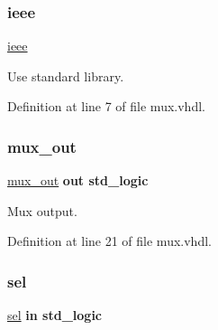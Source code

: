\subsubsection{\texorpdfstring{ieee}{ieee}}
{\footnotesize\ttfamily \hyperlink{classmux__using__with_a0a6af6eef40212dbaf130d57ce711256}{ieee}\hspace{0.3cm}{\ttfamily [Library]}}



Use standard library. 



Definition at line 7 of file mux.\+vhdl.

\mbox{\label{classmux__using__with_a4702d5a6e2987c3dfd152f7615550900}} 
\subsubsection{\texorpdfstring{mux\+\_\+out}{mux\_out}}
{\footnotesize\ttfamily \hyperlink{classmux__using__with_a4702d5a6e2987c3dfd152f7615550900}{mux\+\_\+out} {\bfseries \textcolor{keywordflow}{out}\textcolor{vhdlchar}{ }} {\bfseries \textcolor{comment}{std\+\_\+logic}\textcolor{vhdlchar}{ }} \hspace{0.3cm}{\ttfamily [Port]}}



Mux output. 



Definition at line 21 of file mux.\+vhdl.

\mbox{\label{classmux__using__with_a1ef41b973fb9b3613d5b1ed10445c395}} 
\subsubsection{\texorpdfstring{sel}{sel}}
{\footnotesize\ttfamily \hyperlink{classmux__using__with_a1ef41b973fb9b3613d5b1ed10445c395}{sel} {\bfseries \textcolor{keywordflow}{in}\textcolor{vhdlchar}{ }} {\bfseries \textcolor{comment}{std\+\_\+logic}\textcolor{vhdlchar}{ }} \hspace{0.3cm}{\ttfamily [Port]}}




